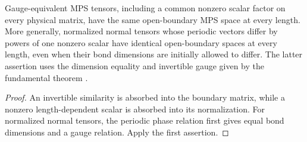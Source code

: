 \begin{lemma}
    \label{thm:primitive_representative_support_gauge}
    \leanok
    Gauge-equivalent MPS tensors, including a common nonzero scalar factor
    on every physical matrix, have the same open-boundary MPS space at every
    length. More generally, normalized normal tensors whose periodic vectors
    differ by powers of one nonzero scalar have identical open-boundary
    spaces at every length, even when their bond dimensions are initially
    allowed to differ. The latter assertion uses the dimension equality and
    invertible gauge given by the fundamental theorem
    \cite[Proposition~2.7, Theorem~2.10]{Cirac2016MPDO_arXiv}.
\end{lemma}
\begin{proof}\leanok
    An invertible similarity is absorbed into the boundary matrix, while
    a nonzero length-dependent scalar is absorbed into its normalization.
    For normalized normal tensors, the periodic phase relation first gives
    equal bond dimensions and a gauge relation. Apply the first assertion.
\end{proof}

